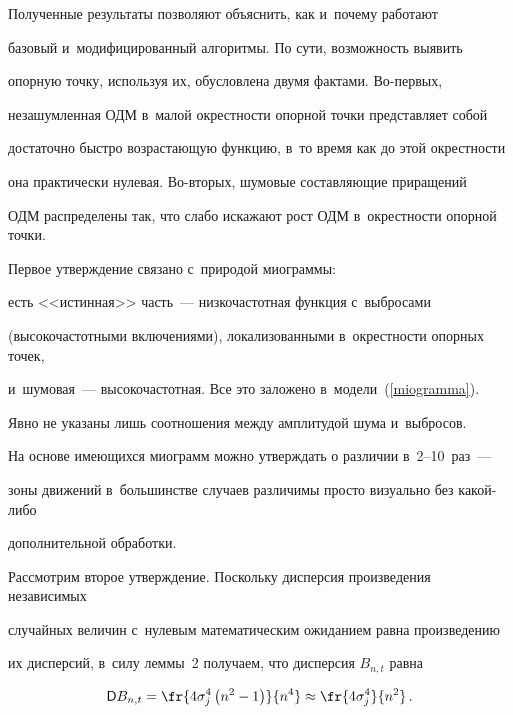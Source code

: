     Полученные результаты позволяют объяснить, как и~почему работают


    базовый и~модифицированный алгоритмы. По сути, возможность выявить


    опорную точку, используя их, обусловлена двумя фактами. Во-пер\-вых,


    незашумленная ОДМ в~малой окрестности опорной точки представляет собой


    достаточно быстро возрастающую функцию, в~то время как до этой окрестности


    она практически нулевая. Во-вто\-рых, шумовые составляющие приращений


    ОДМ распределены так, что слабо искажают рост ОДМ в~окрестности опорной точки.





    Первое утверждение связано с~природой миограммы:


    есть <<истинная>> часть~--- низкочастотная функция с~выбросами


    (высокочастотными включениями), локализованными в~окрестности опорных точек,


    и~шумовая~--- высо\-ко\-час\-тот\-ная. Все это заложено в~модели~(\ref{miogramma}).


    Явно не указаны лишь соотношения между амплитудой шума и~выбросов.


    На основе имеющихся миограмм можно утверждать о различии в~2--10~раз~---


    зоны движений в~большинстве случаев различимы просто визуально без ка\-кой-ли\-бо


    дополнительной обработки.





    Рассмотрим второе утверждение. Поскольку дисперсия произведения независимых


    случайных величин с~нулевым математическим ожиданием равна произведению


    их дисперсий, в~силу леммы~2 получаем, что дисперсия $B_{n,t}$ равна


    \begin{equation}


        \label{disp_B}


        {\sf D}B_{n,t} = \fr{4\sigma_j^4\left(n^2-1\right)}{n^4} \approx


        \fr{4\sigma_j^4}{n^2}\,.


    \end{equation}


